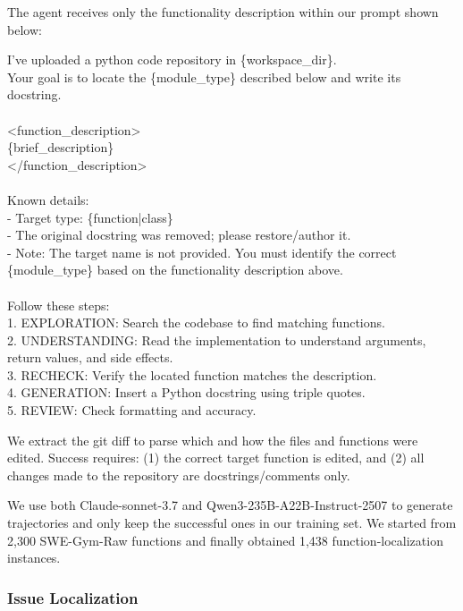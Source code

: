 \documentclass{article}
\theoremstyle{plain}
\theoremstyle{definition}
\theoremstyle{remark}
\begin{document}
The agent receives only the functionality description within our prompt shown below:
\begin{tcolorbox}[colback=gray!5!white,colframe=gray!75!black,title=Function Localization Prompt,fontupper=\small\ttfamily,breakable]
I've uploaded a python code repository in \{workspace\_dir\}.\\
Your goal is to locate the \{module\_type\} described below and write its docstring.\\
\\
<function\_description>\\
\{brief\_description\}\\
</function\_description>\\
\\
Known details:\\
- Target type: \{function|class\}\\
- The original docstring was removed; please restore/author it.\\
- Note: The target name is not provided. You must identify the correct \{module\_type\} based on the functionality description above.\\
\\
Follow these steps:\\
1. EXPLORATION: Search the codebase to find matching functions.\\
2. UNDERSTANDING: Read the implementation to understand arguments, return values, and side effects.\\
3. RECHECK: Verify the located function matches the description.\\
4. GENERATION: Insert a Python docstring using triple quotes.\\
5. REVIEW: Check formatting and accuracy.
\end{tcolorbox}

We extract the git diff to parse which and how the files and functions were edited. Success requires: (1) the correct target function is edited, and (2) all changes made to the repository are docstrings/comments only.

We use both Claude-sonnet-3.7 and Qwen3-235B-A22B-Instruct-2507 to generate trajectories and only keep the successful ones in our training set.
We started from 2,300 SWE-Gym-Raw functions and finally obtained 1,438 function-localization instances.


\subsubsection{Issue Localization}
\end{document}
